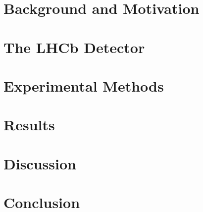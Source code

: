 \documentclass[10pt]{report}
\begin{document}
\newpage
\tableofcontents

\setlength{\parskip}{1em}
\renewcommand{\baselinestretch}{1.5}

\newpage

\chapter{Background and Motivation}


\chapter{The LHCb Detector}

\chapter{Experimental Methods}

\chapter{Results}
\chapter{Discussion}



\newpage
\chapter*{Conclusion}



\footnotesize
%
%






\label{lastpage}
\end{document}
